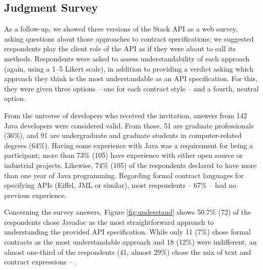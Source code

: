 \subsection{Judgment Survey}
\label{sec:surveyResults}

As a follow-up, we showed three versions of the Stack API as a web survey, asking questions about those approaches to contract specifications; we suggested respondents play the client role of the API as if they were about to call its methods.
Respondents were asked to assess understandability of each approach (again, using a 1--5 Likert scale), in addition to providing a verdict asking which approach they think is the most understandable as an API specification. For this, they were given three options -- one for each contract style -- and a fourth, neutral option.

From the universe of developers who received the invitation, answers from 142 Java developers were considered valid.
From those, 51 are graduate professionals (36\%), and 91 are undergraduate and graduate students in computer-related degrees (64\%).
Having some experience with Java was a requirement for being a participant; more than 73\% (105) have experience with either open source or industrial projects. Likewise, 74\% (105) of the respondents declared to have more than one year of Java programming.
Regarding formal contract languages for specifying APIs (Eiffel, JML or similar), most respondents -- 67\% -- had no previous experience. 


Concerning the survey answers, Figure \ref{fig:understand} shows 50.7\% (72) of the respondents chose Javadoc as the most straightforward approach to understanding the provided API specification. 
While only 11 (7\%) chose formal contracts as the most understandable approach and 18 (12\%) were indifferent, an almost one-third of the respondents (41, almost 29\%) chose the mix of text and contract expressions -- \contractjdoc{}.


